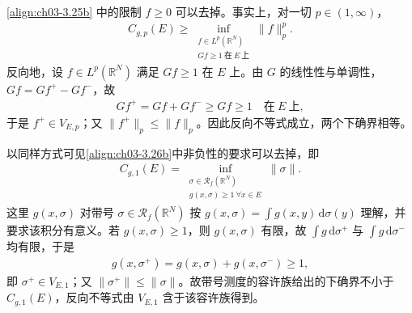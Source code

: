 \documentclass[../../main.tex]{subfiles}%
\begin{document}
\begin{remark}\label{remark:ch03-非负可去}
\eqref{align:ch03-3.25b} 中的限制 $f\geqslant0$ 可以去掉。事实上，对一切 $p\in(1,\infty)$，
\begin{align*}
C_{g,p}(E)\geqslant\inf_{\substack{f\in L^p(\mathbb{R}^N)\\ Gf\geqslant1\ \text{在}\ E\ \text{上}}}\|f\|_p^p .
\end{align*}
反向地，设 $f\in L^p(\mathbb{R}^N)$ 满足 $Gf\geqslant1$ 在 $E$ 上。由 $G$ 的线性性与单调性，$Gf=Gf^+-Gf^-$，故
\begin{align*}
Gf^+=Gf+Gf^-\geqslant Gf\geqslant1\quad\text{在}\ E\ \text{上},
\end{align*}
于是 $f^+\in V_{E,p}$；又 $\|f^+\|_p\leqslant\|f\|_p$。因此反向不等式成立，两个下确界相等。

以同样方式可见\eqref{align:ch03-3.26b}中非负性的要求可以去掉，即
\begin{align*}
C_{g,1}(E)=\inf_{\substack{\sigma\in\mathscr{R}_f(\mathbb{R}^N)\\ g(x,\sigma)\geqslant1\ \forall x\in E}}\|\sigma\|.
\end{align*}
这里 $g(x,\sigma)$ 对带号 $\sigma\in\mathscr{R}_f(\mathbb{R}^N)$ 按 $g(x,\sigma)=\int g(x,y)\,\mathrm{d}\sigma(y)$ 理解，并要求该积分有意义。若 $g(x,\sigma)\geqslant1$，则 $g(x,\sigma)$ 有限，故 $\int g\,\mathrm{d}\sigma^+$ 与 $\int g\,\mathrm{d}\sigma^-$ 均有限，于是
\begin{align*}
g(x,\sigma^+)=g(x,\sigma)+g(x,\sigma^-)\geqslant1,
\end{align*}
即 $\sigma^+\in V_{E,1}$；又 $\|\sigma^+\|\leqslant\|\sigma\|$。故带号测度的容许族给出的下确界不小于 $C_{g,1}(E)$，反向不等式由 $V_{E,1}$ 含于该容许族得到。
\end{remark}
\end{document}
